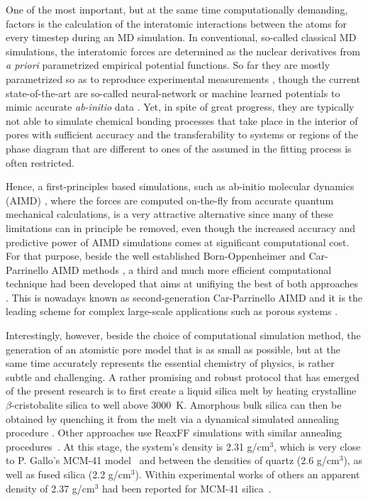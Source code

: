 \documentclass[AMA,STIX2COL]{WileyNJD-v2} %
\begin{document}
One of the most important, but at the same time computationally demanding, factors is the calculation of the interatomic interactions between the atoms for every timestep during an MD simulation. In conventional, so-called classical MD simulations, the interatomic forces are determined as the nuclear derivatives from \textit{a priori} parametrized empirical potential functions. So far they are mostly parametrized so as to reproduce experimental measurements \cite{Kuehne2015}, though the current state-of-the-art are so-called neural-network or machine learned potentials to mimic accurate \textit{ab-initio} data \cite{Ghasemi2022}. Yet, in spite of great progress, they are typically not able to simulate chemical bonding processes that take place in the interior of pores with sufficient accuracy and the transferability to systems or regions of the phase diagram that are different to ones of the assumed in the fitting process is often restricted.

Hence, a first-principles based simulations, such as ab-initio molecular dynamics (AIMD) \cite{Hutter2023}, where the forces are computed on-the-fly from accurate quantum mechanical calculations, is a very attractive alternative since many of these limitations can in principle be removed, even though the increased accuracy and predictive power of AIMD simulations comes at significant computational cost. For that purpose, beside the well established Born-Oppenheimer and Car-Parrinello AIMD methods \cite{Car1985}, a third and much more efficient computational technique had been developed that aims at unifiying the best of both approaches \cite{Kuehne2007}. This is nowadays known as second-generation Car-Parrinello AIMD and it is the leading scheme for complex large-scale applications such as porous systems \cite{Prodan2018,Prodan2020}.

Interestingly, however, beside the choice of computational simulation method, the generation of an atomistic pore model that is as small as possible, but at the same time accurately represents the essential chemistry of physics, is rather subtle and challenging. A rather promising and robust protocol that has emerged of the present research is to first create a liquid silica melt by heating crystalline $\beta$-cristobalite silica to well above 3000~K. Amorphous bulk silica can then be obtained by quenching it from the melt via a dynamical simulated annealing procedure \cite{Camellone2009}.
Other approaches use ReaxFF simulations with similar annealing procedures~\cite{Allolio_2014}. At this stage, the system's density is 2.31 g/cm$^{3}$, which is very close to P. Gallo’s MCM-41 model~\cite{Gallo2010} and between the densities of quartz (2.6 g/cm$^{3}$), as well as fused silica (2.2 g/cm$^{3}$). Within experimental works of others an apparent density of 2.37 g/cm$^{3}$ had been reported for MCM-41 silica~\cite{Weinberger2016}.
\end{document}
